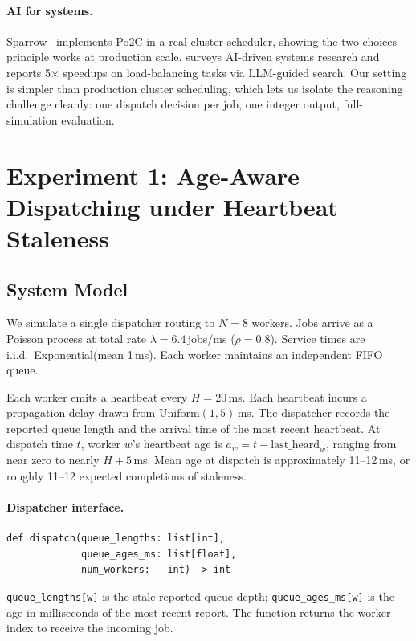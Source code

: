 \documentclass[11pt]{article}
\begin{document}
\paragraph{AI for systems.}
Sparrow~\citep{ousterhout2013sparrow} implements Po2C in a real
cluster scheduler, showing the two-choices principle works at
production scale.
\citet{cheng2025barbarians} surveys AI-driven systems research and
reports 5$\times$ speedups on load-balancing tasks via LLM-guided
search.
Our setting is simpler than production cluster scheduling, which lets
us isolate the reasoning challenge cleanly: one dispatch decision per
job, one integer output, full-simulation evaluation.

\section{Experiment 1: Age-Aware Dispatching under Heartbeat Staleness}
\label{sec:exp1}

\subsection{System Model}
\label{sec:exp1-setup}

We simulate a single dispatcher routing to $N{=}8$ workers.
Jobs arrive as a Poisson process at total rate $\lambda{=}6.4$\,jobs/ms
($\rho{=}0.8$).
Service times are i.i.d.\ Exponential(mean 1\,ms).
Each worker maintains an independent FIFO queue.

Each worker emits a heartbeat every $H{=}20$\,ms.
Each heartbeat incurs a propagation delay drawn from
$\mathrm{Uniform}(1,5)$\,ms.
The dispatcher records the reported queue length and the arrival time
of the most recent heartbeat.
At dispatch time $t$, worker $w$'s heartbeat age is
$a_w = t - \text{last\_heard}_w$, ranging from near zero to nearly
$H{+}5$\,ms.
Mean age at dispatch is approximately 11--12\,ms, or roughly 11--12
expected completions of staleness.

\paragraph{Dispatcher interface.}
\begin{lstlisting}
def dispatch(queue_lengths: list[int],
             queue_ages_ms: list[float],
             num_workers:   int) -> int
\end{lstlisting}
\texttt{queue\_lengths[w]} is the stale reported queue depth;
\texttt{queue\_ages\_ms[w]} is the age in milliseconds of the most
recent report.
The function returns the worker index to receive the incoming job.
\end{document}
